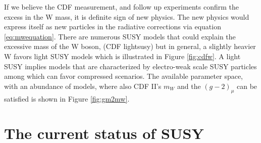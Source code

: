 If we believe the CDF measurement, and follow up experiments confirm the excess in the W mass, it is definite sign of new physics. The new physics would express itself as new particles in the radiative corrections via equation \ref{eq:mwequation}. There are numerous SUSY models that could explain the excessive mass of the W boson, (CDF lightsusy) but in general, a slightly heavier W favors light SUSY models which is illustrated in Figure \ref{fig:cdfw}. A light SUSY implies models that are characterized by electro-weak scale SUSY particles among which  can favor compressed scenarios. The available parameter space, with an abundance of models,  where also CDF II's $m_W$ and the $(g-2)_\mu$ can be satisfied is shown in Figure \ref{fig:gm2mw}.
\section{The current status of SUSY}

